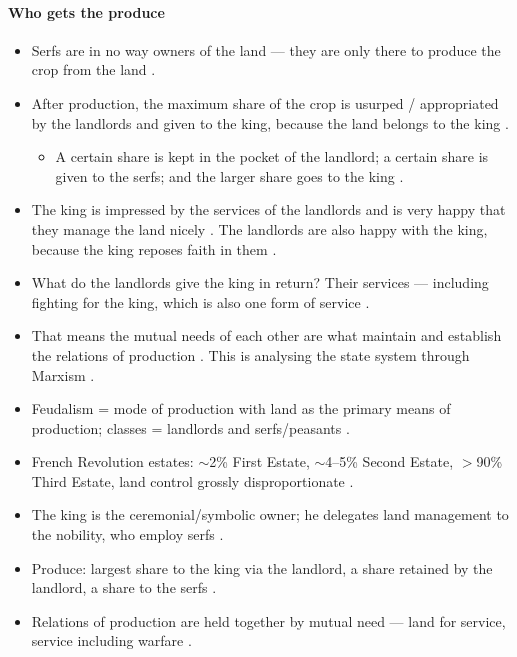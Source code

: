 \paragraph{Who gets the produce}
\begin{itemize}
    \item Serfs are in no way owners of the land --- they are only there to produce the crop from the land .
    \item After production, the maximum share of the crop is usurped / appropriated by the landlords and given to the king, because the land belongs to the king .
    \begin{itemize}
        \item A certain share is kept in the pocket of the landlord; a certain share is given to the serfs; and the larger share goes to the king .
    \end{itemize}
    \item The king is impressed by the services of the landlords and is very happy that they manage the land nicely . The landlords are also happy with the king, because the king reposes faith in them .
    \item What do the landlords give the king in return? Their services --- including fighting for the king, which is also one form of service .
    \item That means the mutual needs of each other are what maintain and establish the relations of production . This is analysing the state system through Marxism .
\end{itemize}

\begin{QuickRevision}
\begin{itemize}
    \item Feudalism = mode of production with land as the primary means of production; classes = landlords and serfs/peasants .
    \item French Revolution estates: $\sim$2\% First Estate, $\sim$4--5\% Second Estate, $>$90\% Third Estate, land control grossly disproportionate .
    \item The king is the ceremonial/symbolic owner; he delegates land management to the nobility, who employ serfs .
    \item Produce: largest share to the king via the landlord, a share retained by the landlord, a share to the serfs .
    \item Relations of production are held together by mutual need --- land for service, service including warfare .
\end{itemize}
\end{QuickRevision}

